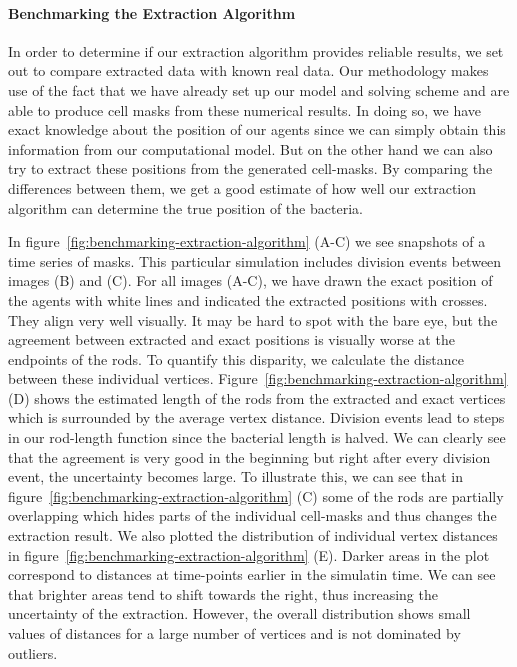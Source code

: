 \documentclass{article}
\begin{document}
\paragraph{Benchmarking the Extraction Algorithm}

In order to determine if our extraction algorithm provides reliable results, we set out to compare
extracted data with known real data.
Our methodology makes use of the fact that we have already set up our model and solving scheme and
are able to produce cell masks from these numerical results.
In doing so, we have exact knowledge about the position of our agents since we can simply obtain
this information from our computational model.
But on the other hand we can also try to extract these positions from the generated cell-masks.
By comparing the differences between them, we get a good estimate of how well our extraction
algorithm can determine the true position of the bacteria.

In figure~\ref{fig:benchmarking-extraction-algorithm} (A-C) we see snapshots of a time series of
masks.
This particular simulation includes division events between images (B) and (C).
For all images (A-C), we have drawn the exact position of the agents with white lines and indicated
the extracted positions with crosses.
They align very well visually.
It may be hard to spot with the bare eye, but the agreement between extracted and exact positions is
visually worse at the endpoints of the rods.
To quantify this disparity, we calculate the distance between these individual vertices.
Figure~\ref{fig:benchmarking-extraction-algorithm} (D) shows the estimated length of the rods from
the extracted and exact vertices which is surrounded by the average vertex distance.
Division events lead to steps in our rod-length function since the bacterial length is halved.
We can clearly see that the agreement is very good in the beginning but right after every division
event, the uncertainty becomes large.
To illustrate this, we can see that in figure~\ref{fig:benchmarking-extraction-algorithm} (C) some
of the rods are partially overlapping which hides parts of the individual cell-masks and thus
changes the extraction result.
We also plotted the distribution of individual vertex distances in
figure~\ref{fig:benchmarking-extraction-algorithm} (E).
Darker areas in the plot correspond to distances at time-points earlier in the simulatin time.
We can see that brighter areas tend to shift towards the right, thus increasing the uncertainty of
the extraction.
However, the overall distribution shows small values of distances for a large number of vertices and
is not dominated by outliers.
\end{document}
